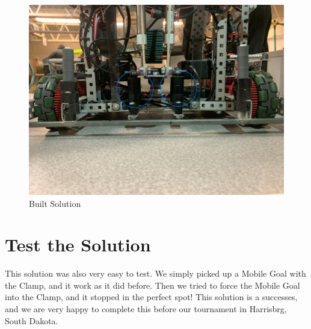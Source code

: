 \begin{figure}[H]
    \centering
    \includegraphics[width=0.5\linewidth]{images/Stoppers MoGoV1.1.jpeg}
    \caption{Built Solution}
    \label{fig:stoppers-v1.1}
\end{figure}
\section*{Test the Solution}
This solution was also very easy to test. We simply picked up a Mobile Goal with the Clamp, and it work as it did before. Then we tried to force the Mobile Goal into the Clamp, and it stopped in the perfect spot! This solution is a successes, and we are very happy to complete this before our tournament in Harrisbrg, South Dakota.
